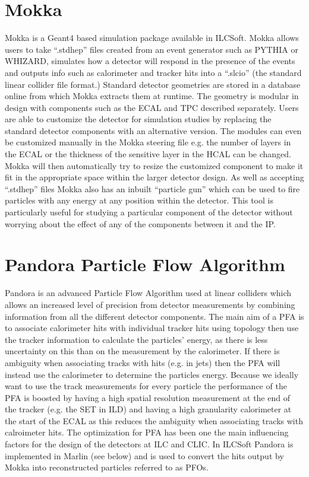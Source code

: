 \section{Mokka}
Mokka is a Geant4 based simulation package available in ILCSoft. Mokka allows users to take ``.stdhep'' files created from an event generator such as PYTHIA or WHIZARD, simulates how a detector will respond in the presence of the events and outputs info such as calorimeter and tracker hits into a ``.slcio'' (the standard linear collider file format.) Standard detector geometries are stored in a database online from which Mokka extracts them at runtime. The geometry is modular in design with components such as the ECAL and TPC described separately. Users are able to customize the detector for simulation studies by replacing the standard detector components with an alternative version. The modules can even be customized manually in the Mokka steering file e.g. the number of layers in the ECAL or the thickness of the sensitive layer in the HCAL can be changed. Mokka will then automatically try to resize the customized component to make it fit in the appropriate space within the larger detector design. As well as accepting ``.stdhep'' files Mokka also has an inbuilt ``particle gun'' which can be used to fire particles with any energy at any position within the detector. This tool is particularly useful for studying a particular component of the detector without worrying about the effect of any of the components between it and the \ac{IP}.

\section{Pandora Particle Flow Algorithm}
\label{Pandora}
Pandora is an advanced Particle Flow Algorithm used at linear colliders which allows an increased level of precision from detector measurements by combining information from all the different detector components. The main aim of a \ac{PFA} is to associate calorimeter hits with individual tracker hits using topology then use the tracker information to calculate the particles' energy, as there is less uncertainty on this than on the measurement by the calorimeter. If there is ambiguity when associating tracks with hits (e.g. in jets) then the \ac{PFA} will instead use the calorimeter to determine the particles energy. Because we ideally want to use the track measurements for every particle the performance of the \ac{PFA} is boosted by having a high spatial resolution measurement at the end of the tracker (e.g. the \ac{SET} in \ac{ILD}) and having a high granularity calorimeter at the start of the \ac{ECAL} as this reduces the ambiguity when associating tracks with calroimeter hits. The optimization for \ac{PFA} has been one the main influencing factors for the design of the detectors at ILC and CLIC. In ILCSoft Pandora is implemented in Marlin (see below) and is used to convert the hits output by Mokka into reconstructed particles referred to as \ac{PFOs}.

